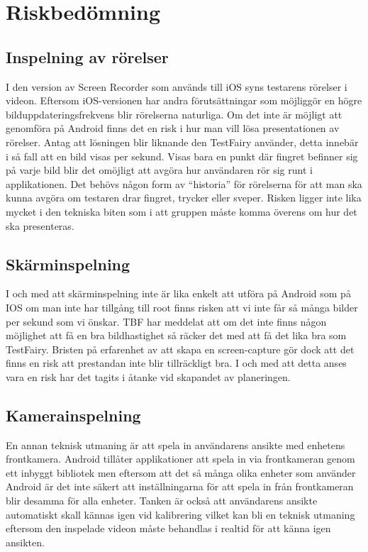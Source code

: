 \section{Riskbedömning}

\subsection{Inspelning av rörelser}
I den version av Screen Recorder som används till iOS syns testarens rörelser i videon. Eftersom iOS-versionen har andra förutsättningar som möjliggör en högre bilduppdateringsfrekvens blir rörelserna naturliga. Om det inte är möjligt att genomföra på Android finns det en risk i hur man vill lösa presentationen av rörelser. Antag att lösningen blir liknande den TestFairy använder, detta innebär i så fall att en bild visas per sekund. Visas bara en punkt där fingret befinner sig på varje bild blir det omöjligt att avgöra hur användaren rör sig runt i applikationen. Det behövs någon form av ``historia'' för rörelserna för att man ska kunna avgöra om testaren drar fingret, trycker eller sveper. Risken ligger inte lika mycket i den tekniska biten som i att gruppen måste komma överens om hur det ska presenteras.

\subsection{Skärminspelning}
I och med att skärminspelning inte är lika enkelt att utföra på Android som på IOS om man inte har tillgång till root finns risken att vi inte får så många bilder per sekund som vi önskar. TBF har meddelat att om det inte finns någon möjlighet att få en bra bildhastighet så räcker det med att få det lika bra som TestFairy. Bristen på erfarenhet av att skapa en screen-capture gör dock att det finns en risk att prestandan inte blir tillräckligt bra. I och med att detta anses vara en risk har det tagits i åtanke vid skapandet av planeringen.

\subsection{Kamerainspelning}
En annan teknisk utmaning är att spela in användarens ansikte med enhetens frontkamera. Android tillåter applikationer att spela in via frontkameran genom ett inbyggt bibliotek men eftersom att det så många olika enheter som använder Android är det inte säkert att inställningarna för att spela in från frontkameran blir desamma för alla enheter. Tanken är också att användarens ansikte automatiskt skall kännas igen vid kalibrering vilket kan bli en teknisk utmaning eftersom den inspelade videon måste behandlas i realtid för att känna igen ansikten.